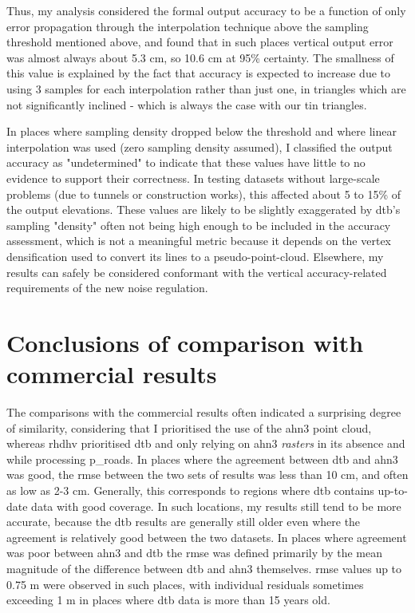 Thus, my analysis considered the formal output accuracy to be a function of only error propagation through the interpolation technique above the sampling threshold mentioned above, and found that in such places vertical output error was almost always about 5.3 cm, so 10.6 cm at 95\% certainty. The smallness of this value is explained by the fact that accuracy is expected to increase due to using 3 samples for each interpolation rather than just one, in triangles which are not significantly inclined - which is always the case with our \ac{tin} triangles.

In places where sampling density dropped below the threshold and where linear interpolation was used (zero sampling density assumed), I classified the output accuracy as "undetermined" to indicate that these values have little to no evidence to support their correctness. In testing datasets without large-scale problems (due to tunnels or construction works), this affected about 5 to 15\% of the output elevations. These values are likely to be slightly exaggerated by \ac{dtb}'s sampling "density" often not being high enough to be included in the accuracy assessment, which is not a meaningful metric because it depends on the vertex densification used to convert its lines to a pseudo-point-cloud. Elsewhere, my results can safely be considered conformant with the vertical accuracy-related requirements of the new noise regulation.

\section{Conclusions of comparison with commercial results}
\label{sec:conclusionscomparison}

The comparisons with the commercial results often indicated a surprising degree of similarity, considering that I prioritised the use of the \ac{ahn3} point cloud, whereas \ac{rhdhv} prioritised \ac{dtb} and only relying on \ac{ahn3} \textit{rasters} in its absence and while processing \ac{p_roads}. In places where the agreement between \ac{dtb} and \ac{ahn3} was good, the \ac{rmse} between the two sets of results was less than 10 cm, and often as low as 2-3 cm. Generally, this corresponds to regions where \ac{dtb} contains up-to-date data with good coverage. In such locations, my results still tend to be more accurate, because the \ac{dtb} results are generally still older even where the agreement is relatively good between the two datasets. In places where agreement was poor between \ac{ahn3} and \ac{dtb} the \ac{rmse} was defined primarily by the mean magnitude of the difference between \ac{dtb} and \ac{ahn3} themselves. \ac{rmse} values up to 0.75 m were observed in such places, with individual residuals sometimes exceeding 1 m in places where \ac{dtb} data is more than 15 years old.

